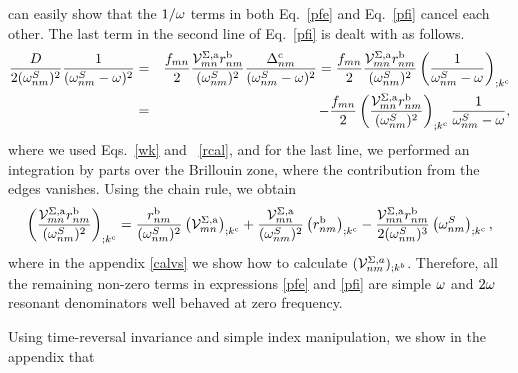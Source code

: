 \documentclass[floatfix,prb,aps,superscriptaddress,11pt,preprint]{revtex4}
\begin{document}
can easily show that the $1/\omega$ terms in both Eq.~\eqref{pfe} and Eq.~\eqref{pfi}
cancel each other.
The last term in the second line of Eq.~\eqref{pfi} is dealt with as
follows.
\begin{eqnarray}\label{dresn}
\frac{D}{2(\omega^S_{nm})^2}\frac{1}{(\omega^S_{nm}-\omega)^2}
&=&
\frac{f_{mn}}{2}\frac{{\mathbf{\cal V}}^{\Sigma,\mathrm{a}}_{mn}r^{\mathrm{b}}_{nm}}{(\omega^S_{nm})^2}
\frac{\Delta^{\mathrm{c}}_{nm}}{(\omega^S_{nm}-\omega)^2} 
=
\frac{f_{mn}}{2}
\frac{{\mathbf{\cal V}}^{\Sigma,\mathrm{a}}_{mn}r^{\mathrm{b}}_{nm}}{(\omega^S_{nm})^2}
\left(
\frac{1}{\omega^S_{nm}-\omega}
\right)_{;k^{\mathrm{c}}}
\nonumber\\
&=&
-
\frac{f_{mn}}{2}
\left(
\frac{{\mathbf{\cal V}}^{\Sigma,\mathrm{a}}_{mn}r^{\mathrm{b}}_{nm}}{(\omega^S_{nm})^2}
\right)_{;k^{\mathrm{c}}}
\frac{1}{\omega^S_{nm}-\omega}
,
\end{eqnarray} 
where we used Eqs.~\eqref{wk} and ~\eqref{rcal}, and for the last
line, we performed an
integration by parts over the Brillouin zone,
where the contribution from the edges vanishes.\cite{aschcroft}
Using the chain rule, we obtain
\begin{eqnarray}\label{chrn}
\left(
\frac{{\mathbf{\cal V}}^{\Sigma,\mathrm{a}}_{mn}r^{\mathrm{b}}_{nm}}{(\omega^S_{nm})^2}
\right)_{;k^{\mathrm{c}}}
=
\frac{r^{\mathrm{b}}_{nm}}{(\omega^S_{nm})^2}
\left(
{\mathbf{\cal V}} ^{\Sigma,\mathrm{a}}_{mn}
\right)_{;k^{\mathrm{c}}}
+
\frac{{\mathbf{\cal V}}^{\Sigma,\mathrm{a}}_{mn}}{(\omega^S_{nm})^2}
\left(
r^{\mathrm{b}}_{nm}
\right)_{;k^{\mathrm{c}}}
-
\frac{{\mathbf{\cal V}}^{\Sigma,\mathrm{a}}_{mn}r^{\mathrm{b}}_{nm}}{2(\omega^S_{nm})^3}
\left(
\omega^S_{nm}
\right)_{;k^{\mathrm{c}}}
,
\end{eqnarray}
where in the appendix \ref{calvs} 
we show how to calculate $({\mathbf{\cal V}}^{\Sigma,a}_{nm})_{;k^b}$.
Therefore, all the remaining non-zero terms in expressions \eqref{pfe}
and \eqref{pfi} 
are simple $\omega$ and $2\omega$ resonant denominators well behaved at zero
frequency. 

Using time-reversal invariance and simple index manipulation, we show
in the appendix that
\end{document}

